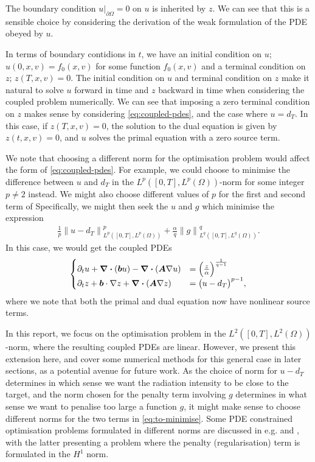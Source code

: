 The boundary condition ${u \rvert}_{\partial \Omega} = 0$ on $u$ is inherited by $z$. We can see that this is a sensible choice by considering the derivation of the weak formulation of the PDE obeyed by $u$.

In terms of boundary contidions in $t$, we have an initial condition on $u$; $u(0,x,v)=f_0(x,v)$ for some function $f_0(x,v)$ and a terminal condition on $z$; $z(T,x,v)=0$. The initial condition on $u$ and terminal condition on $z$ make it natural to solve $u$ forward in time and $z$ backward in time when considering the coupled problem numerically. We can see that imposing a zero terminal condition on $z$ makes sense by considering \autoref{eq:coupled-pdes}, and the case where $u=d_T$. In this case, if $z(T,x,v)=0$, the solution to the dual equation is given by $z(t,x,v)=0$, and $u$ solves the primal equation with a zero source term. 

We note that choosing a different norm for the optimisation problem would affect the form of \autoref{eq:coupled-pdes}. For example, we could choose to minimise the difference between $u$ and $d_T$ in the $L^p([0,T],L^p(\Omega))$-norm for some integer $p\neq 2$ instead. We might also choose different values of $p$ for the first and second term of Specifically, we might then seek the $u$ and $g$ which minimise the expression 
%
\begin{align} 
    \label{eq:gen-norm-to-minimise}
    \frac{1}{p} {\lVert u - d_T \rVert}^p_{L^p([0,T],L^p(\Omega))} + \frac{\alpha}{q} {\lVert g \rVert}^q_{L^q([0,T],L^q(\Omega))}.
\end{align}
%
In this case, we would get the coupled PDEs 
%
\begin{align} 
    \label{eq:nonlinear-pde-system}
    \begin{cases} 
        \partial_t u + \div{(\boldsymbol{b}u)} - \div{(\boldsymbol{A} \nabla u)} &= {\Big(\frac{z}{\alpha} \Big)}^{\frac{1}{q-1}} \\
        \partial_t z + \boldsymbol{b} \cdot \nabla z + \div{(\boldsymbol{A} \nabla z)} &= {\big(u - d_T\big)}^{p-1},
    \end{cases}
\end{align}
%
where we note that both the primal and dual equation now have nonlinear source terms. 

In this report, we focus on the optimisation problem in the $L^2([0,T],L^2(\Omega))$-norm, where the resulting coupled PDEs are linear. However, we present this extension here, and cover some numerical methods for this general case in later sections, as a potential avenue for future work. As the choice of norm for $u-d_T$ determines in which sense we want the radiation intensity to be close to the target, and the norm chosen for the penalty term involving $g$ determines in what sense we want to penalise too large a function $g$, it might make sense to choose different norms for the two terms in \autoref{eq:to-minimise}. Some PDE constrained optimisation problems formulated in different norms are discussed in e.g. \cite{troltzsch2010optimal} and \cite{barker2016fast}, with the latter presenting a problem where the penalty (regularisation) term is formulated in the $H^1$ norm.


